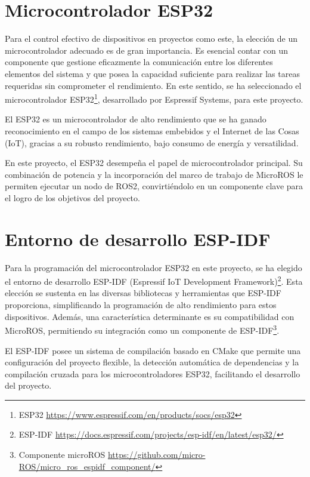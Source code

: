 \section{Microcontrolador ESP32}

Para el control efectivo de dispositivos en proyectos como este, la elección de un microcontrolador adecuado es de gran importancia. Es esencial contar con un componente que gestione eficazmente la comunicación entre los diferentes elementos del sistema y que posea la capacidad suficiente para realizar las tareas requeridas sin comprometer el rendimiento. En este sentido, se ha seleccionado el microcontrolador ESP32\footnote{ESP32 \url{https://www.espressif.com/en/products/socs/esp32}}, desarrollado por Espressif Systems, para este proyecto.



El ESP32 es un microcontrolador de alto rendimiento que se ha ganado reconocimiento en el campo de los sistemas embebidos y el Internet de las Cosas (IoT), gracias a su robusto rendimiento, bajo consumo de energía y versatilidad.



En este proyecto, el ESP32 desempeña el papel de microcontrolador principal. Su combinación de potencia y la incorporación del marco de trabajo de MicroROS le permiten ejecutar un nodo de ROS2, convirtiéndolo en un componente clave para el logro de los objetivos del proyecto.


\section{Entorno de desarrollo ESP-IDF}

Para la programación del microcontrolador ESP32 en este proyecto, se ha elegido el entorno de desarrollo ESP-IDF (Espressif IoT Development Framework)\footnote{ESP-IDF \url{https://docs.espressif.com/projects/esp-idf/en/latest/esp32/}}. Esta elección se sustenta en las diversas bibliotecas y herramientas que ESP-IDF proporciona, simplificando la programación de alto rendimiento para estos dispositivos. Además, una característica determinante es su compatibilidad con MicroROS, permitiendo su integración como un componente de ESP-IDF\footnote{Componente microROS \url{https://github.com/micro-ROS/micro_ros_espidf_component/}}.



El ESP-IDF posee un sistema de compilación basado en CMake que permite una configuración del proyecto flexible, la detección automática de dependencias y la compilación cruzada para los microcontroladores ESP32, facilitando el desarrollo del proyecto.


